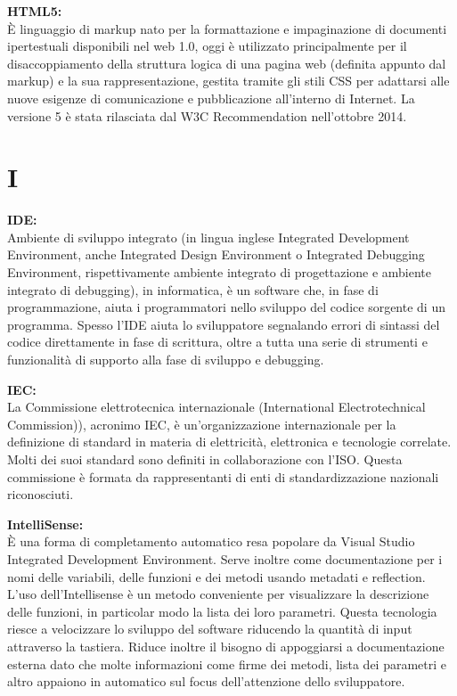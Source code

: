 \documentclass[a4paper, oneside, openany, dvipsnames, table]{article}
\begin{document}
\textbf{HTML5:}\\	\`E linguaggio di markup nato per la formattazione e impaginazione di documenti ipertestuali disponibili nel web 1.0, oggi è utilizzato principalmente per il disaccoppiamento della struttura logica di una pagina web (definita appunto dal markup)
 e la sua rappresentazione, gestita tramite gli stili CSS per adattarsi alle nuove esigenze di comunicazione e pubblicazione all'interno di Internet. La versione 5 è stata rilasciata dal W3C Recommendation nell'ottobre 2014.

\newpage
\section{I}
\textbf{IDE:}\\	Ambiente di sviluppo integrato (in lingua inglese Integrated Development Environment, anche Integrated Design Environment o Integrated Debugging Environment, rispettivamente ambiente integrato di progettazione e ambiente integrato di debugging), in informatica, è un software che, in fase di programmazione, aiuta i programmatori nello sviluppo del codice sorgente di un programma. Spesso l'IDE aiuta lo sviluppatore segnalando errori di sintassi del codice direttamente in fase di scrittura, oltre a tutta una serie di strumenti e funzionalità di supporto alla fase di sviluppo e debugging.

\textbf{IEC:}\\	La Commissione elettrotecnica internazionale (International Electrotechnical Commission)), 
acronimo IEC, è un'organizzazione internazionale 
per la definizione di standard in materia di elettricità, elettronica e tecnologie correlate. Molti dei suoi standard sono 
definiti in collaborazione con l'ISO. Questa commissione è formata da 
rappresentanti di enti di standardizzazione nazionali riconosciuti.

\textbf{IntelliSense:}\\	\`E una forma di completamento automatico resa popolare da Visual Studio Integrated Development Environment.
 Serve inoltre come documentazione per i nomi delle variabili, delle funzioni e dei metodi usando  metadati e reflection. L'uso dell'Intellisense è un metodo conveniente per visualizzare la descrizione delle funzioni, in particolar modo la lista dei loro parametri. Questa tecnologia riesce a velocizzare  lo sviluppo del software riducendo la quantità di input attraverso la tastiera.  Riduce inoltre il bisogno di appoggiarsi a documentazione esterna dato che molte informazioni come firme dei metodi, lista dei parametri e altro appaiono in automatico sul focus dell'attenzione dello sviluppatore.
\end{document}
